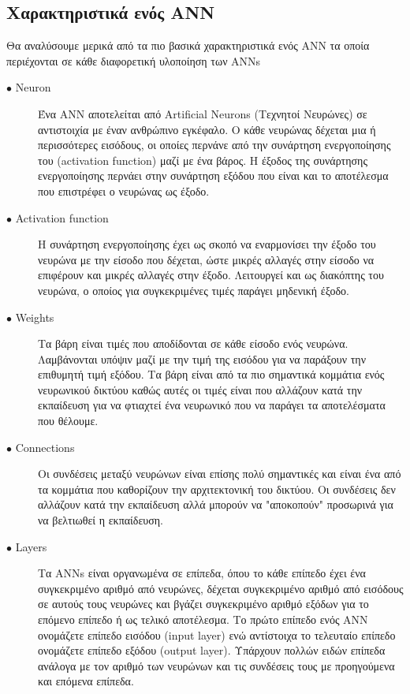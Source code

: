 \subsection{Χαρακτηριστικά ενός ANN}
Θα αναλύσουμε μερικά από τα πιο βασικά χαρακτηριστικά ενός ANN τα οποία περιέχονται σε κάθε διαφορετική υλοποίηση των ANNs

\begin{description}

\item[$\bullet$ Neuron] Ένα ANN αποτελείται από Artificial Neurons (Τεχνητοί Νευρώνες) σε αντιστοιχία με έναν ανθρώπινο εγκέφαλο. Ο κάθε νευρώνας δέχεται μια ή περισσότερες εισόδους, οι οποίες περνάνε από την συνάρτηση ενεργοποίησης του (activation function) μαζί με ένα βάρος. Η έξοδος της συνάρτησης ενεργοποίησης περνάει στην συνάρτηση εξόδου που είναι και το αποτέλεσμα που επιστρέφει ο νευρώνας ως έξοδο.

\item[$\bullet$ Activation function] Η συνάρτηση ενεργοποίησης έχει ως σκοπό να εναρμονίσει την έξοδο του νευρώνα με την είσοδο που δέχεται, ώστε μικρές αλλαγές στην είσοδο να επιφέρουν και μικρές αλλαγές στην έξοδο. Λειτουργεί και ως διακόπτης του νευρώνα, ο οποίος για συγκεκριμένες τιμές παράγει μηδενική έξοδο.

\item[$\bullet$ Weights] Τα βάρη είναι τιμές που αποδίδονται σε κάθε είσοδο ενός νευρώνα. Λαμβάνονται υπόψιν μαζί με την τιμή της εισόδου για να παράξουν την επιθυμητή τιμή εξόδου. Τα βάρη είναι από τα πιο σημαντικά κομμάτια ενός νευρωνικού δικτύου καθώς αυτές οι τιμές είναι που αλλάζουν κατά την εκπαίδευση για να φτιαχτεί ένα νευρωνικό που να παράγει τα αποτελέσματα που θέλουμε.

\item[$\bullet$ Connections] Οι συνδέσεις μεταξύ νευρώνων είναι επίσης πολύ σημαντικές και είναι ένα από τα κομμάτια που καθορίζουν την αρχιτεκτονική του δικτύου. Οι συνδέσεις δεν αλλάζουν κατά την εκπαίδευση αλλά μπορούν να "αποκοπούν" προσωρινά για να βελτιωθεί η εκπαίδευση.

\item[$\bullet$ Layers] Τα ANNs είναι οργανωμένα σε επίπεδα, όπου το κάθε επίπεδο έχει ένα συγκεκριμένο αριθμό από νευρώνες, δέχεται συγκεκριμένο αριθμό από εισόδους σε αυτούς τους νευρώνες και βγάζει συγκεκριμένο αριθμό εξόδων για το επόμενο επίπεδο ή ως τελικό αποτέλεσμα. Το πρώτο επίπεδο ενός ANN ονομάζετε επίπεδο εισόδου (input layer) ενώ αντίστοιχα το τελευταίο επίπεδο ονομάζετε επίπεδο εξόδου (output layer). Υπάρχουν πολλών ειδών επίπεδα ανάλογα με τον αριθμό των νευρώνων και τις συνδέσεις τους με προηγούμενα και επόμενα επίπεδα. 

\end{description}


